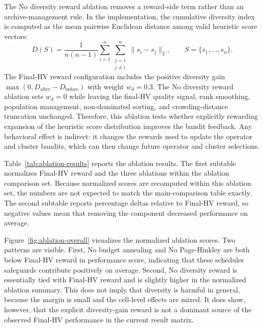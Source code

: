 \documentclass[../main.tex]{subfiles}
\begin{document}
The No diversity reward ablation removes a reward-side term rather than an archive-management rule. In the implementation, the cumulative diversity index is computed as the mean pairwise Euclidean distance among valid heuristic score vectors:
\begin{equation}
  D(S)
  =
  \frac{1}{n(n-1)}
  \sum_{i=1}^{n}
  \sum_{\substack{j=1\\j\ne i}}^{n}
  \lVert s_i-s_j\rVert_2,
  \qquad S=\{s_1,\ldots,s_n\}.
  \label{eq:cdi-ablation-chapter5}
\end{equation}
The Final-HV reward configuration includes the positive diversity gain $\max(0,D_{\mathrm{after}}-D_{\mathrm{before}})$ with weight $w_d=0.3$. The No diversity reward ablation sets $w_d=0$ while leaving the final-HV quality signal, rank smoothing, population management, non-dominated sorting, and crowding-distance truncation unchanged. Therefore, this ablation tests whether explicitly rewarding expansion of the heuristic score distribution improves the bandit feedback. Any behavioral effect is indirect: it changes the rewards used to update the operator and cluster bandits, which can then change future operator and cluster selections.



Table~\ref{tab:ablation-results} reports the ablation results. The first subtable normalizes Final-HV reward and the three ablations within the ablation comparison set. Because normalized scores are recomputed within this ablation set, the numbers are not expected to match the main-comparison table exactly. The second subtable reports percentage deltas relative to Final-HV reward, so negative values mean that removing the component decreased performance on average.



Figure~\ref{fig:ablation-overall} visualizes the normalized ablation scores. Two patterns are visible. First, No budget annealing and No Page-Hinkley are both below Final-HV reward in performance score, indicating that these scheduler safeguards contribute positively on average. Second, No diversity reward is essentially tied with Final-HV reward and is slightly higher in the normalized ablation summary. This does not imply that diversity is harmful in general, because the margin is small and the cell-level effects are mixed. It does show, however, that the explicit diversity-gain reward is not a dominant source of the observed Final-HV performance in the current result matrix.
\end{document}
